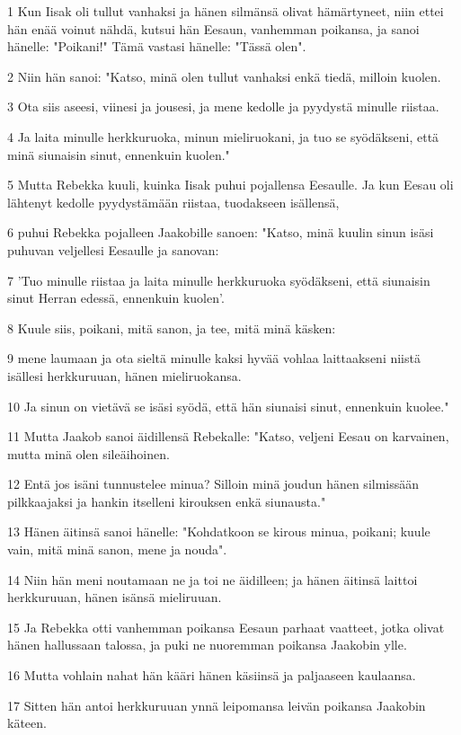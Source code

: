 \par 1 Kun Iisak oli tullut vanhaksi ja hänen silmänsä olivat hämärtyneet, niin ettei hän enää voinut nähdä, kutsui hän Eesaun, vanhemman poikansa, ja sanoi hänelle: "Poikani!" Tämä vastasi hänelle: "Tässä olen".
\par 2 Niin hän sanoi: "Katso, minä olen tullut vanhaksi enkä tiedä, milloin kuolen.
\par 3 Ota siis aseesi, viinesi ja jousesi, ja mene kedolle ja pyydystä minulle riistaa.
\par 4 Ja laita minulle herkkuruoka, minun mieliruokani, ja tuo se syödäkseni, että minä siunaisin sinut, ennenkuin kuolen."
\par 5 Mutta Rebekka kuuli, kuinka Iisak puhui pojallensa Eesaulle. Ja kun Eesau oli lähtenyt kedolle pyydystämään riistaa, tuodakseen isällensä,
\par 6 puhui Rebekka pojalleen Jaakobille sanoen: "Katso, minä kuulin sinun isäsi puhuvan veljellesi Eesaulle ja sanovan:
\par 7 'Tuo minulle riistaa ja laita minulle herkkuruoka syödäkseni, että siunaisin sinut Herran edessä, ennenkuin kuolen'.
\par 8 Kuule siis, poikani, mitä sanon, ja tee, mitä minä käsken:
\par 9 mene laumaan ja ota sieltä minulle kaksi hyvää vohlaa laittaakseni niistä isällesi herkkuruuan, hänen mieliruokansa.
\par 10 Ja sinun on vietävä se isäsi syödä, että hän siunaisi sinut, ennenkuin kuolee."
\par 11 Mutta Jaakob sanoi äidillensä Rebekalle: "Katso, veljeni Eesau on karvainen, mutta minä olen sileäihoinen.
\par 12 Entä jos isäni tunnustelee minua? Silloin minä joudun hänen silmissään pilkkaajaksi ja hankin itselleni kirouksen enkä siunausta."
\par 13 Hänen äitinsä sanoi hänelle: "Kohdatkoon se kirous minua, poikani; kuule vain, mitä minä sanon, mene ja nouda".
\par 14 Niin hän meni noutamaan ne ja toi ne äidilleen; ja hänen äitinsä laittoi herkkuruuan, hänen isänsä mieliruuan.
\par 15 Ja Rebekka otti vanhemman poikansa Eesaun parhaat vaatteet, jotka olivat hänen hallussaan talossa, ja puki ne nuoremman poikansa Jaakobin ylle.
\par 16 Mutta vohlain nahat hän kääri hänen käsiinsä ja paljaaseen kaulaansa.
\par 17 Sitten hän antoi herkkuruuan ynnä leipomansa leivän poikansa Jaakobin käteen.
